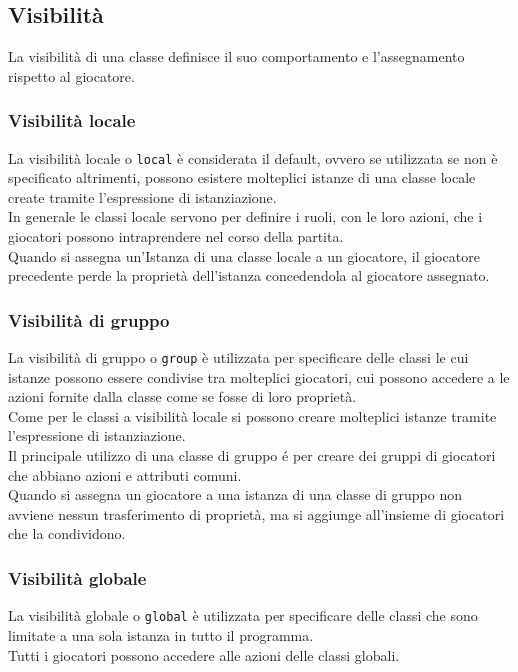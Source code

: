 \subsection{Visibilità} \label{VisibilitaClasse}
La visibilità di una classe definisce il suo comportamento e l'assegnamento rispetto al giocatore.

\subsubsection{Visibilità locale}
La visibilità locale o \verb|local| è considerata il default, ovvero se utilizzata se non è specificato
altrimenti, possono esistere molteplici istanze di una classe locale create tramite l'espressione di istanziazione. \\
In generale le classi locale servono per definire i ruoli, con le loro azioni, che i giocatori possono
intraprendere nel corso della partita. \\
Quando si assegna un'Istanza di una classe locale a un giocatore, il giocatore precedente perde la proprietà dell'istanza
concedendola al giocatore assegnato.

\subsubsection{Visibilità di gruppo}
La visibilità di gruppo o \verb|group| è utilizzata per specificare delle classi le cui istanze possono
essere condivise tra molteplici giocatori, cui possono accedere a le azioni fornite dalla classe come 
se fosse di loro proprietà. \\
Come  per le classi a visibilità locale si possono creare molteplici istanze tramite l'espressione di istanziazione. \\
Il principale utilizzo di una classe di gruppo é per creare dei gruppi di giocatori che abbiano
azioni e attributi comuni. \\
Quando si assegna un giocatore a una istanza di una classe di gruppo non avviene nessun trasferimento
di proprietà, ma si aggiunge all'insieme di giocatori che la condividono.

\subsubsection{Visibilità globale}
La visibilità globale o \verb|global| è utilizzata per specificare delle classi che sono 
limitate a una sola istanza in tutto il programma. \\
Tutti i giocatori possono accedere alle azioni delle classi globali.

